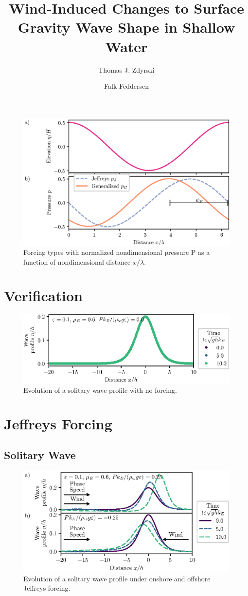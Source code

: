 \documentclass{jfm}
\title{Wind-Induced Changes to Surface Gravity Wave Shape in Shallow Water}
\author{Thomas J. Zdyrski \and Falk Feddersen}
\let\Oldsection\section
\renewcommand{\section}{\FloatBarrier\Oldsection}
\let\Oldsubsection\subsection
\renewcommand{\subsection}{\FloatBarrier\Oldsubsection}
\begin{document}
\begin{figure}
  \centering
  \includegraphics{Forcing-Types.eps}
  \caption{
    Forcing types with normalized nondimensional pressure P as a
    function of nondimensional distance $x/\lambda$.
  }
\end{figure}

\section{Verification}
\begin{figure}
  \centering
  \includegraphics{Solitary-Verf.eps}
  \caption{
    Evolution of a solitary wave profile with no forcing.
   }
 \end{figure}

\section{Jeffreys Forcing}
\subsection{Solitary Wave}
\begin{figure}
  \centering
  \includegraphics{Snapshots-Positive-Negative.eps}
  \caption{
    Evolution of a solitary wave profile under onshore and offshore Jeffreys
    forcing.
  }
\end{figure}
\end{document}
